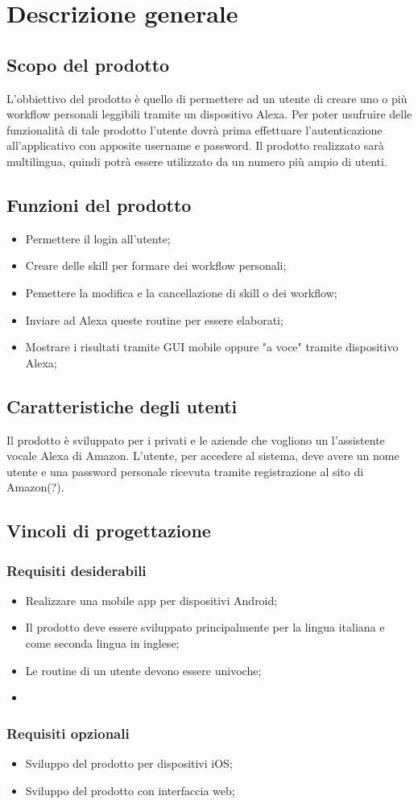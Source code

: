 \chapter{Descrizione generale}

\section{Scopo del prodotto}
L'obbiettivo del prodotto è quello di permettere ad un utente di creare uno o più workflow personali leggibili tramite un dispositivo Alexa.
Per poter usufruire delle funzionalità di tale prodotto l'utente dovrà prima effettuare l'autenticazione all'applicativo con apposite username e password.
Il prodotto realizzato sarà multilingua, quindi potrà essere utilizzato da un numero più ampio di utenti.


\section{Funzioni del prodotto}
\begin{itemize}
	\item Permettere il login all'utente;
	\item Creare delle skill per formare dei workflow personali;
	\item Pemettere la modifica e la cancellazione di skill o dei workflow;
	\item Inviare ad Alexa queste routine per essere elaborati;
	\item Mostrare i risultati tramite GUI mobile oppure "a voce" tramite dispositivo Alexa;
\end{itemize}

\section{Caratteristiche degli utenti}
Il prodotto è sviluppato per i privati e le aziende che vogliono un l'assistente vocale Alexa di Amazon.
L'utente, per accedere al sistema, deve avere un nome utente e una password personale ricevuta tramite registrazione al sito di Amazon(?).

\section{Vincoli di progettazione}
\subsection{Requisiti desiderabili}
\begin{itemize}
	\item Realizzare una mobile app per dispositivi Android;
	\item Il prodotto deve essere sviluppato principalmente per la lingua italiana e come seconda lingua in inglese;
	\item Le routine di un utente devono essere univoche;
	\item
\end{itemize}
\subsection{Requisiti opzionali}
\begin{itemize}
	\item Sviluppo del prodotto per dispositivi iOS;
	\item Sviluppo del prodotto con interfaccia web;
\end{itemize}